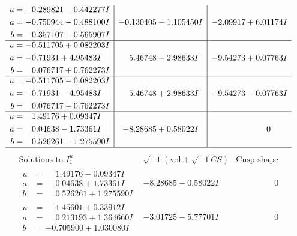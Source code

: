 \documentclass[1p]{elsarticle_modified}
\theoremstyle{definition}
\newcommand{\I}{\sqrt{-1}}
\begin{document}
$$\begin{array}{c|c|c}
\begin{aligned}
u &= -0.289821 - 0.442277 I \\
a &= -0.750944 - 0.488100 I \\
b &= \phantom{-}0.357107 - 0.565907 I\end{aligned}
 & -0.130405 - 1.105450 I & -2.09917 + 6.01174 I \\ \hline\begin{aligned}
u &= -0.511705 + 0.082203 I \\
a &= -0.71931 + 4.95483 I \\
b &= \phantom{-}0.076717 + 0.762273 I\end{aligned}
 & \phantom{-}5.46748 - 2.98633 I & -9.54273 + 0.07763 I \\ \hline\begin{aligned}
u &= -0.511705 - 0.082203 I \\
a &= -0.71931 - 4.95483 I \\
b &= \phantom{-}0.076717 - 0.762273 I\end{aligned}
 & \phantom{-}5.46748 + 2.98633 I & -9.54273 - 0.07763 I \\ \hline\begin{aligned}
u &= \phantom{-}1.49176 + 0.09347 I \\
a &= \phantom{-}0.04638 - 1.73361 I \\
b &= \phantom{-}0.526261 - 1.275590 I\end{aligned}
 & -8.28685 + 0.58022 I & \phantom{-0.000000 } 0\\
 \hline 
 \end{array}$$\newpage$$\begin{array}{c|c|c}  
\text{Solutions to }I^u_{1}& \I (\text{vol} + \sqrt{-1}CS) & \text{Cusp shape}\\
 \hline 
\begin{aligned}
u &= \phantom{-}1.49176 - 0.09347 I \\
a &= \phantom{-}0.04638 + 1.73361 I \\
b &= \phantom{-}0.526261 + 1.275590 I\end{aligned}
 & -8.28685 - 0.58022 I & \phantom{-0.000000 } 0 \\ \hline\begin{aligned}
u &= \phantom{-}1.45601 + 0.33912 I \\
a &= \phantom{-}0.213193 + 1.364660 I \\
b &= -0.705900 + 1.030080 I\end{aligned}
 & -3.01725 - 5.77701 I & \phantom{-0.000000 } 0 \\ \hline\begin{aligned}

\end{aligned}
\end{array}$$
\end{document}
